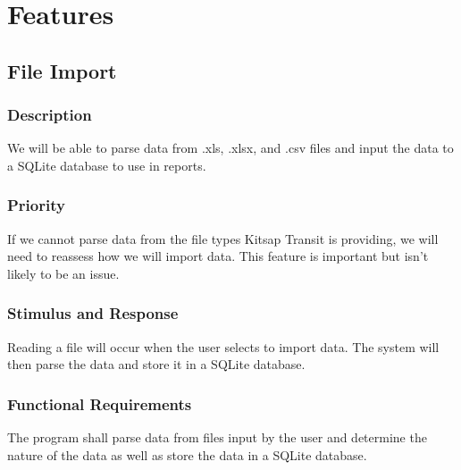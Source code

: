 \section{Features}


\subsection{File Import}
\subsubsection{Description}
We will be able to parse data from .xls, .xlsx, and .csv files and input the data to a SQLite database to use in reports.

\subsubsection{Priority}
If we cannot parse data from the file types Kitsap Transit is providing, we will need to reassess how we will import data. This feature is important but isn't likely to be an issue.

\subsubsection{Stimulus and Response}
Reading a file will occur when the user selects to import data. The system will then parse the data and store it in a SQLite database.

\subsubsection{Functional Requirements}
The program shall parse data from files input by the user and determine the nature of the data as well as store the data in a SQLite database.


